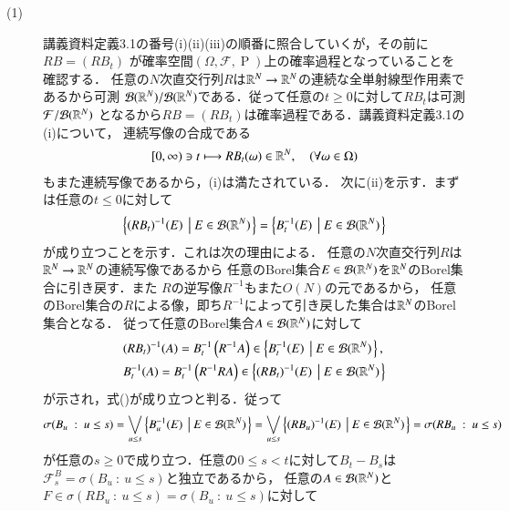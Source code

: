 \begin{prf}
\begin{description}\mbox{}
	\item[(1)] 
		講義資料定義3.1の番号(i)(ii)(iii)の順番に照合していくが，その前に$RB = (RB_t)$
		が確率空間$(\Omega, \mathcal{F}, \operatorname{P})$上の確率過程となっていることを確認する．
		任意の$N$次直交行列$R$は$\mathbb{R}^N \rightarrow \mathbb{R}^N$の連続な全単射線型作用素であるから可測
		$\mathcal{B}(\mathbb{R}^N)/\mathcal{B}(\mathbb{R}^N)$である．従って任意の$t \geq 0$に対して$RB_t$は可測$\mathcal{F}/\mathcal{B}(\mathbb{R}^N)$
		となるから$RB = (RB_t)$は確率過程である．講義資料定義3.1の(i)について，
		連続写像の合成である
		\begin{align}
			[0,\infty) \ni t \longmapsto RB_t(\omega) \in \mathbb{R}^N, \quad(\forall \omega \in \Omega)
		\end{align}
		もまた連続写像であるから，(i)は満たされている．
		次に(ii)を示す．まずは任意の$t \leq 0$に対して
		\begin{align}
			\left\{(RB_t)^{-1}(E)\ \left|\ E \in \mathcal{B}(\mathbb{R}^N) \right.\right\} 
			= \left\{B_t^{-1}(E)\ \left|\ E \in \mathcal{B}(\mathbb{R}^N) \right.\right\} \label{eq:stoc_proc_Q1_1}
		\end{align}
		が成り立つことを示す．これは次の理由による．
		任意の$N$次直交行列$R$は$\mathbb{R}^N \rightarrow \mathbb{R}^N$の連続写像であるから
		任意のBorel集合$E \in \mathcal{B}(\mathbb{R}^N)$を$\mathbb{R}^N$のBorel集合に引き戻す．また
		$R$の逆写像$R^{-1}$もまた$O(N)$の元であるから，
		任意のBorel集合の$R$による像，即ち$R^{-1}$によって引き戻した集合は$\mathbb{R}^N$のBorel集合となる．
		従って任意のBorel集合$A \in \mathcal{B}(\mathbb{R}^N)$に対して
		\begin{align}
			&(RB_t)^{-1}(A) = B_t^{-1}\left(R^{-1}A\right) \in \left\{B_t^{-1}(E)\ \left|\ E \in \mathcal{B}(\mathbb{R}^N) \right.\right\}, \\
			&B_t^{-1}(A) = B_t^{-1}\left(R^{-1}RA\right) \in \left\{(RB_t)^{-1}(E)\ \left|\ E \in \mathcal{B}(\mathbb{R}^N) \right.\right\}
		\end{align}
		が示され，式()が成り立つと判る．従って
		\begin{align}
			\sigma(B_u\ :\ u \leq s) = \bigvee_{u \leq s} \left\{B_u^{-1}(E)\ \left|\ E \in \mathcal{B}(\mathbb{R}^N) \right.\right\}
			= \bigvee_{u \leq s} \left\{(RB_u)^{-1}(E)\ \left|\ E \in \mathcal{B}(\mathbb{R}^N) \right.\right\} 
			= \sigma(RB_u\ :\ u \leq s)
		\end{align}
		が任意の$s \geq 0$で成り立つ．任意の$0 \leq s < t$に対して$B_t - B_s$は$\mathcal{F}_s^B = \sigma(B_u\ :\ u \leq s)$と独立であるから，
		任意の$A \in \mathcal{B}(\mathbb{R}^N)$と$F \in \sigma(RB_u\ :\ u \leq s) = \sigma(B_u\ :\ u \leq s)$に対して

\end{description}
\end{prf}
